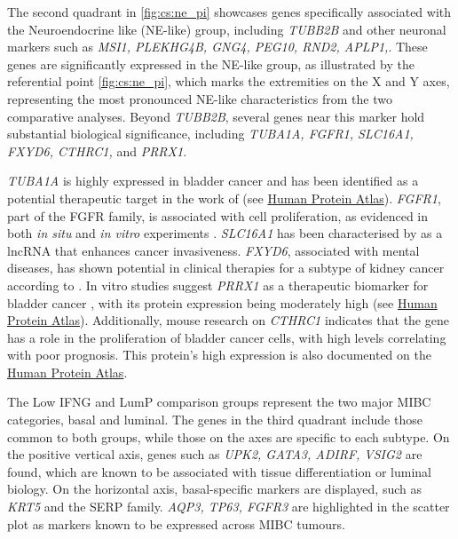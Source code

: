 The second quadrant in \cref{fig:cs:ne_pi} showcases genes specifically associated with the Neuroendocrine like (NE-like) group, including \textit{TUBB2B} and other neuronal markers such as \textit{MSI1, PLEKHG4B, GNG4, PEG10, RND2, APLP1,}\citep{Robertson2017-mg}. These genes are significantly expressed in the NE-like group, as illustrated by the referential point \cref{fig:cs:ne_pi}, which marks the extremities on the X and Y axes, representing the most pronounced NE-like characteristics from the two comparative analyses. Beyond \textit{TUBB2B}, several genes near this marker hold substantial biological significance, including \textit{TUBA1A, FGFR1, SLC16A1, FXYD6, CTHRC1,} and \textit{PRRX1}.

\textit{TUBA1A} is highly expressed in bladder cancer and has been identified as a potential therapeutic target in the work of \citet{Zhang2019-fk} (see \href{https://www.proteinatlas.org/ENSG00000167552-TUBA1A/tissue}{Human Protein Atlas}). \textit{FGFR1}, part of the FGFR family, is associated with cell proliferation, as evidenced in both \textit{in situ} and \textit{in vitro} experiments \citep{Tomlinson2009-td}. \textit{SLC16A1} has been characterised by \citet{Logotheti2020-ya} as a \acrlong{lncRNA} that enhances cancer invasiveness. \textit{FXYD6}, associated with mental diseases, has shown potential in clinical therapies for a subtype of kidney cancer according to \citet{Gao2014-sq}. In vitro studies suggest \textit{PRRX1} as a therapeutic biomarker for bladder cancer \citep{Huang2022-ez}, with its protein expression being moderately high (see \href{https://www.proteinatlas.org/ENSG00000116132-PRRX1/tissue}{Human Protein Atlas}). Additionally, mouse research on \textit{CTHRC1} indicates that the gene has a role in the proliferation of bladder cancer cells, with high levels correlating with poor prognosis. This protein's high expression is also documented on the \href{https://www.proteinatlas.org/ENSG00000164932-CTHRC1/tissue}{Human Protein Atlas}.

The Low IFNG and LumP comparison groups represent the two major MIBC categories, basal and luminal. The genes in the third quadrant include those common to both groups, while those on the axes are specific to each subtype. On the positive vertical axis, genes such as \textit{UPK2, GATA3, ADIRF, VSIG2} are found, which are known to be associated with tissue differentiation or luminal biology. On the horizontal axis, basal-specific markers are displayed, such as \textit{KRT5} and the SERP family. \textit{AQP3, TP63, FGFR3} are highlighted in the scatter plot as markers known to be expressed across MIBC tumours.

